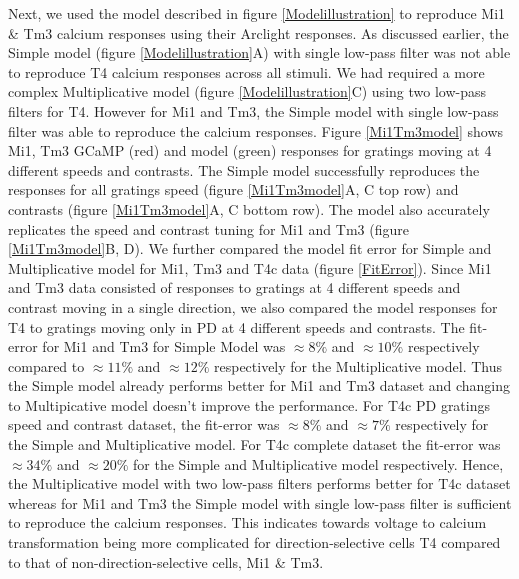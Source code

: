 \documentclass[9pt,lineno]{elife}
\begin{document}
Next, we used the model described in figure \ref{Modelillustration} to reproduce Mi1 \& Tm3 calcium responses using their Arclight responses. As discussed earlier, the Simple model (figure \ref{Modelillustration}A) with single low-pass filter was not able to reproduce T4 calcium responses across all stimuli. We had required a more complex Multiplicative model (figure \ref{Modelillustration}C) using two low-pass filters for T4. However for Mi1 and Tm3, the Simple model with single low-pass filter was able to reproduce the calcium responses. Figure \ref{Mi1Tm3model} shows Mi1, Tm3 GCaMP (red) and model (green) responses for gratings moving at 4 different speeds and contrasts. The Simple model successfully reproduces the responses for all gratings speed (figure \ref{Mi1Tm3model}A, C top row) and contrasts (figure \ref{Mi1Tm3model}A, C bottom row). The model also accurately replicates the speed and contrast tuning for Mi1 and Tm3 (figure \ref{Mi1Tm3model}B, D). We further compared the model fit error for Simple and Multiplicative model for Mi1, Tm3 and T4c data (figure \ref{FitError}). Since Mi1 and Tm3 data consisted of responses to gratings at 4 different speeds and contrast moving in a single direction, we also compared the model responses for T4 to gratings moving only in PD at 4 different speeds and contrasts. The fit-error for Mi1 and Tm3 for Simple Model was $\approx8\%$ and $\approx10\%$ respectively compared to $\approx11\%$ and $\approx12\%$ respectively for the Multiplicative model. Thus the Simple model already performs better for Mi1 and Tm3 dataset and changing to Multipicative model doesn't improve the performance. For T4c PD gratings speed and contrast dataset, the fit-error was $\approx8\%$ and  $\approx7\%$ respectively for the Simple and Multiplicative model. For T4c complete dataset the fit-error was $\approx34\%$ and  $\approx20\%$ for the Simple and Multiplicative model respectively. Hence, the Multiplicative model with two low-pass filters performs better for T4c dataset whereas for Mi1 and Tm3 the Simple model with single low-pass filter is sufficient to reproduce the calcium responses. This indicates towards voltage to calcium transformation being more complicated for direction-selective cells T4 compared to that of non-direction-selective cells, Mi1 \& Tm3.
\end{document}
